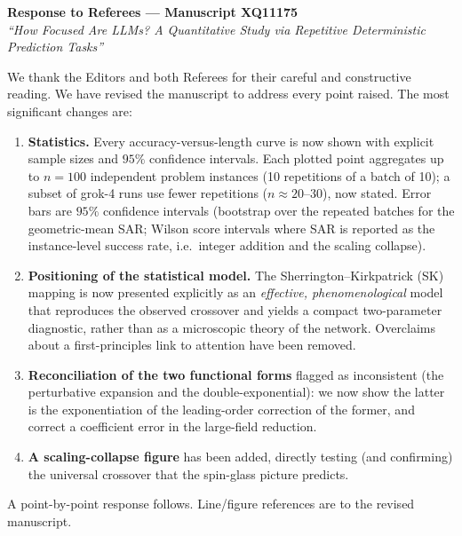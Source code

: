 \documentclass[11pt]{article}
\begin{document}
\begin{center}
{\Large\bfseries Response to Referees --- Manuscript XQ11175}\\[4pt]
\textit{``How Focused Are LLMs? A Quantitative Study via Repetitive Deterministic Prediction Tasks''}
\end{center}

\bigskip

We thank the Editors and both Referees for their careful and constructive reading. We have
revised the manuscript to address every point raised. The most significant changes are:

\begin{enumerate}[leftmargin=*]
  \item \textbf{Statistics.} Every accuracy-versus-length curve is now shown with explicit
        sample sizes and $95\%$ confidence intervals. Each plotted point aggregates up to
        $n=100$ independent problem instances (10 repetitions of a batch of 10); a subset of
        grok-4 runs use fewer repetitions ($n\approx 20$--$30$), now stated. Error bars are
        $95\%$ confidence intervals (bootstrap over the repeated batches for the geometric-mean
        SAR; Wilson score intervals where SAR is reported as the instance-level success rate,
        i.e.\ integer addition and the scaling collapse).
  \item \textbf{Positioning of the statistical model.} The Sherrington--Kirkpatrick (SK)
        mapping is now presented explicitly as an \emph{effective, phenomenological} model that
        reproduces the observed crossover and yields a compact two-parameter diagnostic, rather
        than as a microscopic theory of the network. Overclaims about a first-principles link to
        attention have been removed.
  \item \textbf{Reconciliation of the two functional forms} flagged as inconsistent (the
        perturbative expansion and the double-exponential): we now show the latter is the
        exponentiation of the leading-order correction of the former, and correct a coefficient
        error in the large-field reduction.
  \item \textbf{A scaling-collapse figure} has been added, directly testing (and confirming) the
        universal crossover that the spin-glass picture predicts.
\end{enumerate}

A point-by-point response follows. Line/figure references are to the revised manuscript.
\end{document}
